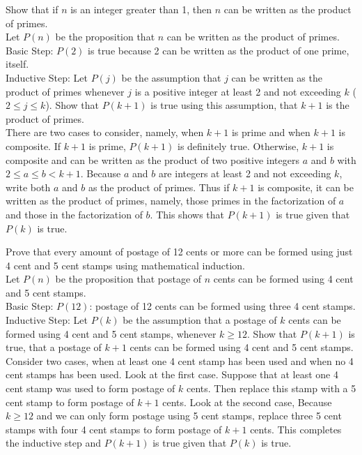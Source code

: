 \documentclass[12pt]{article}
\begin{document}
\begin{example} Show that if $n$ is an integer greater than 1, then $n$ can be written as the product of primes. \\ Let $P(n)$ be the proposition that $n$ can be written as the product of primes. \\ 
Basic Step: $P(2)$ is true because 2 can be written as the product of one prime, itself. \\
Inductive Step: Let $P(j)$ be the assumption that $j$ can be written as the product of primes whenever $j$ is a positive integer at least 2 and not exceeding $k$ ($2 \leq j \leq k$). Show that $P(k + 1)$ is true using this assumption, that $k + 1$ is the product of primes. \\
There are two cases to consider, namely, when $k + 1$ is prime and when $k + 1$ is composite. If $k +1$ is prime, $P(k + 1)$ is definitely true. Otherwise, $k + 1$ is composite and can be written as the product of two positive integers $a$ and $b$ with $2 \leq a \leq b < k + 1$. Because $a$ and $b$ are integers at least 2 and not exceeding $k$, write both $a$ and $b$ as the product of primes. Thus if $k + 1$ is composite, it can be written as the product of primes, namely, those primes in the factorization of $a$ and those in the factorization of $b$. This shows that $P(k + 1)$ is true given that $P(k)$ is true. \end{example} 

\begin{example} Prove that every amount of postage of 12 cents or more can be formed using just 4 cent and 5 cent stamps using mathematical induction.  \\ 
Let $P(n)$ be the proposition that postage of $n$ cents can be formed using 4 cent and 5 cent stamps. \\ 
Basic Step: $P(12)$: postage of 12 cents can be formed using three 4 cent stamps. \\
Inductive Step: Let $P(k)$ be the assumption that a postage of $k$ cents can be formed using 4 cent and 5 cent stamps, whenever $k \geq 12$. Show that $P(k + 1)$ is true, that a postage of $k + 1$ cents can be formed using 4 cent and 5 cent stamps. Consider two cases, when at least one 4 cent stamp has been used and when no 4 cent stamps has been used. Look at the first case. Suppose that at least one 4 cent stamp was used to form postage of $k$ cents. Then replace this stamp with a 5 cent stamp to form postage of $k + 1$ cents. Look at the second case, Because $k \geq 12$ and we can only form postage using 5 cent stamps, replace three 5 cent stamps with four 4 cent stamps to form postage of $k + 1$ cents. This completes the inductive step and $P(k + 1)$ is true given that $P(k)$ is true. \end{example} 
\end{document}
